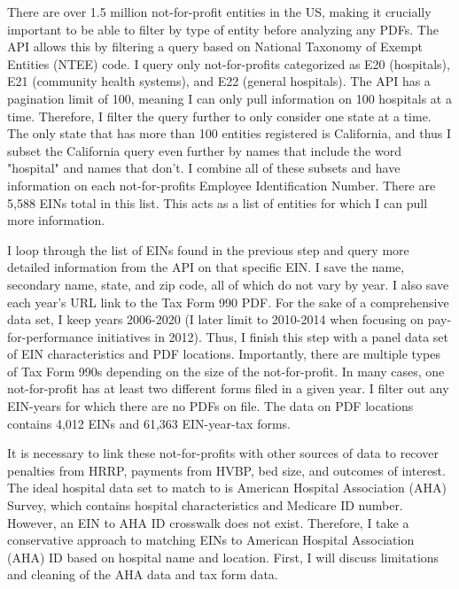 \documentclass[12pt]{article}
\begin{document}
There are over 1.5 million not-for-profit entities in the US, making it crucially important to be able to filter by type of entity before analyzing any PDFs. The API allows this by filtering a query based on National Taxonomy of Exempt Entities (NTEE) code. I query only not-for-profits categorized as E20 (hospitals), E21 (community health systems), and E22 (general hospitals). The API has a pagination limit of 100, meaning I can only pull information on 100 hospitals at a time. Therefore, I filter the query further to only consider one state at a time. The only state that has more than 100 entities registered is California, and thus I subset the California query even further by names that include the word "hospital" and names that don't. I combine all of these subsets and have information on each not-for-profits Employee Identification Number. There are 5,588 EINs total in this list. This acts as a list of entities for which I can pull more information. 

I loop through the list of EINs found in the previous step and query more detailed information from the API on that specific EIN. I save the name, secondary name, state, and zip code, all of which do not vary by year. I also save each year's URL link to the Tax Form 990 PDF. For the sake of a comprehensive data set, I keep years 2006-2020 (I later limit to 2010-2014 when focusing on pay-for-performance initiatives in 2012). Thus, I finish this step with a panel data set of EIN characteristics and PDF locations. Importantly, there are multiple types of Tax Form 990s depending on the size of the not-for-profit. In many cases, one not-for-profit has at least two different forms filed in a given year. I filter out any EIN-years for which there are no PDFs on file. The data on PDF locations contains 4,012 EINs and 61,363 EIN-year-tax forms.

It is necessary to link these not-for-profits with other sources of data to recover penalties from HRRP, payments from HVBP, bed size, and outcomes of interest. The ideal hospital data set to match to is American Hospital Association (AHA) Survey, which contains hospital characteristics and Medicare ID number. However, an EIN to AHA ID crosswalk does not exist. Therefore, I take a conservative approach to matching EINs to American Hospital Association (AHA) ID based on hospital name and location. First, I will discuss limitations and cleaning of the AHA data and tax form data. 
\end{document}
